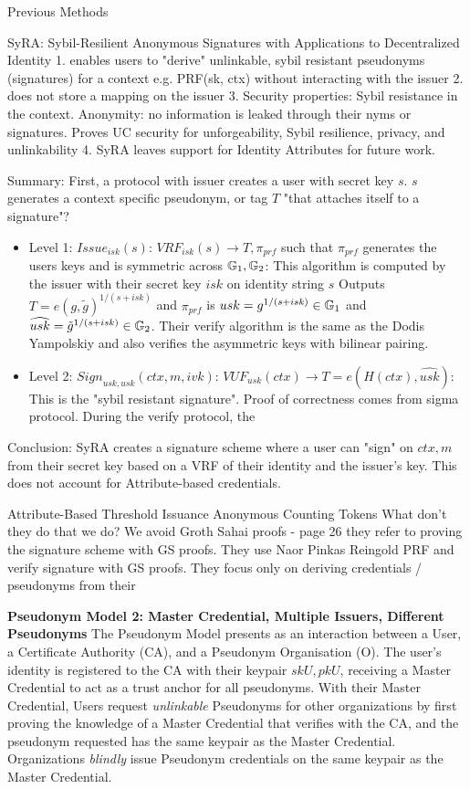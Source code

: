 Previous Methods

\noindent SyRA: Sybil-Resilient Anonymous Signatures  with Applications to Decentralized Identity \cite{crites_syra_2024}
1. enables users to "derive" unlinkable, sybil resistant pseudonyms (signatures) for a context e.g. PRF(sk, ctx) without interacting with the issuer
2. does not store a mapping on the issuer
3. Security properties: Sybil resistance in the context. Anonymity: no information is leaked through their nyms or signatures. Proves UC security for unforgeability, Sybil resilience, privacy, and unlinkability
4. SyRA leaves support for Identity Attributes for future work.

Summary: First, a protocol with issuer creates a user with secret key $s$. $s$ generates a context specific pseudonym, or tag $T$ "that attaches itself to a signature"?

\begin{itemize}
    \item Level 1: $Issue_{isk}(s)$: $VRF_{isk}(s) \to T, \pi_{prf}$ such that $\pi_{prf}$ generates the users keys and is symmetric across $\mathbb{G}_1, \mathbb{G}_2$: This algorithm is computed by the issuer with their secret key $isk$ on identity string $s$ Outputs $T = e(g, \tilde{g})^{1/(s + isk)}$ and $\pi_{prf}$ is $usk = g^{1/(s + isk)} \in \mathbb{G}_1$ and $\widehat{usk} = \tilde{g}^{1/(s + isk)} \in \mathbb{G}_2$. Their verify algorithm is the same as the Dodis Yampolskiy and also verifies the asymmetric keys with bilinear pairing.
    \item Level 2: $Sign_{usk, \widehat{usk}}(ctx, m, ivk)$: $VUF_{usk}(ctx) \to T = e(H(ctx), \widehat{usk})$: This is the "sybil resistant signature". Proof of correctness comes from sigma protocol. During the verify protocol, the 
\end{itemize}

Conclusion: SyRA creates a signature scheme where a user can "sign" on $ctx, m$ from their secret key based on a VRF of their identity and the issuer's key. This does not account for Attribute-based credentials.

Attribute-Based Threshold Issuance Anonymous Counting Tokens \cite{rabaninejad_attribute-based_nodate}
What don't they do that we do?
We avoid Groth Sahai proofs - page 26 they refer to proving the signature scheme with GS proofs. 
They use Naor Pinkas Reingold PRF and verify signature with GS proofs. 
They focus only on deriving credentials / pseudonyms from their

\noindent \textbf{Pseudonym Model 2: Master Credential, Multiple Issuers, Different Pseudonyms}
The Pseudonym Model \cite{goos_pseudonym_2000} presents as an interaction between a User, a Certificate Authority (CA), and a Pseudonym Organisation (O). The user's identity is registered to the CA with their keypair $skU, pkU$, receiving a Master Credential to act as a trust anchor for all pseudonyms. With their Master Credential, Users request \emph{unlinkable} Pseudonyms for other organizations by first proving the knowledge of a Master Credential that verifies with the CA, and the pseudonym requested has the same keypair as the Master Credential. Organizations \emph{blindly} issue Pseudonym credentials on the same keypair as the Master Credential.


